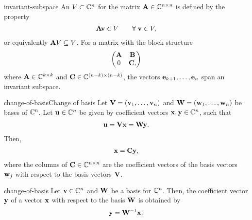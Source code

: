 \begin{Definition}{invariant-subspace}
  An  $V\subset\mathbb C^n$ for the matrix
  $\mathbf A\in\mathbb C^{n\times n}$ is defined by the property
  \begin{gather}
    \mathbf A\mathbf v \in V \qquad \forall\;\mathbf v\in V,
  \end{gather}
  or equivalently $\mathbf A V \subseteq V$.
  For a matrix with the block structure
  \begin{gather}
    \begin{pmatrix}
      \mathbf A & \mathbf B\\ 0 & \mathbf C,
    \end{pmatrix}
  \end{gather}
  where $\mathbf A\in\mathbb C^{k\times k}$ and $\mathbf C\in\mathbb C^{(n-k)\times (n-k)}$,
  the vectors $\mathbf e_{k+1},\dots,\mathbf e_{n}$ span an invariant subspace.
\end{Definition}

\begin{Lemma*}{change-of-basis}{Change of basis}
  Let $\mathbf V = (\mathbf v_1,\dots, \mathbf v_n)$ and $\mathbf W = (\mathbf w_1,\dots, \mathbf w_n)$ be
  bases of $\mathbb C^n$. Let $\mathbf u\in \mathbb C^n$ be given by coefficient vectors
  $\mathbf x,\mathbf y\in \mathbb C^n$, such that
  \begin{gather}
    \mathbf u = \mathbf V\mathbf x = \mathbf W\mathbf y.
  \end{gather}
  Then,
  \begin{gather}
    \mathbf x = \mathbf C \mathbf y,
  \end{gather}
  where the columns of $\mathbf C\in \mathbb C^{n\times n}$ are the coefficient
  vectors of the basis vectors $\mathbf w_j$ with respect to the basis
  vectors $\mathbf V$.
\end{Lemma*}

\begin{Corollary}{change-of-basis}
  Let $\mathbf v\in \mathbb C^n$ and $\mathbf W$ be a basis for $\mathbb C^n$. Then, the
  coefficient vector $\mathbf y$ of a vector $\mathbf x$ with respect to the
  basis $\mathbf W$ is obtained by
  \begin{gather}
    \mathbf y = \mathbf W^{-1} \mathbf x.
  \end{gather}
\end{Corollary}

